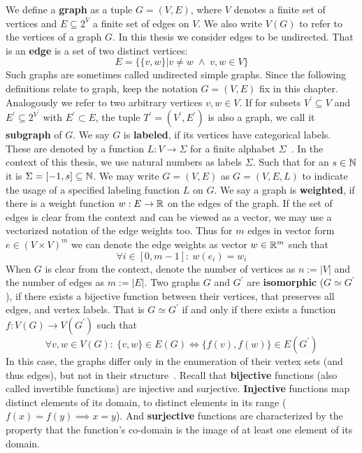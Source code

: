 	We define a \textbf{graph}\label{def:Graph} as a tuple $G=(V, E)$, where $V$ denotes a finite set of vertices and $E\subseteq 2^V$ a finite set of edges on $V$. 
	We also write $V(G)$ to refer to the vertices of a graph $G$.
	In this thesis we consider edges to be undirected. 
	That is an \textbf{edge} is a set of two distinct vertices:
	\[ E=\big\{ \{v,w\}| v\neq w \;\land\; v,w\in V \big\} \]
	Such graphs are sometimes called undirected simple graphs.
	Since the following definitions relate to graph, keep the notation $G=(V,E)$ fix in this chapter.
	Analogously we refer to two arbitrary vertices $v, w\in V$.
	If for subsets $V^\prime \subseteq V$ and $E^\prime \subseteq 2^{V^\prime}$ with $E^\prime\subset E$, the tuple $T^\prime=(V^\prime, E^\prime)$ is also a graph, we call it \textbf{subgraph} of $G$.
	We say $G$ is \textbf{labeled}, if its vertices have categorical labels.
	These are denoted by a function $L:V\to\Sigma$ for a finite alphabet $\Sigma$~\cite{2019_Togninalli_NIPS}.
	In the context of this thesis, we use natural numbers as labels $\Sigma$.
	Such that for an $s\in \mathbb{N}$ it is $\Sigma = [-1, s]\subseteq\mathbb{N}$.
	We may write $G=(V, E)$ as $G=(V, E, L)$ to indicate the usage of a specified labeling function $L$ on $G$.
	We say a graph is \textbf{weighted}, if there is a weight function $w:E\to\mathbb{R}$ on the edges of the graph.
	If the set of edges is clear from the context and can be viewed as a vector, we may use a vectorized notation of the edge weights too.
	Thus for $m$ edges in vector form $e\in (V\times V)^m$ we can denote the edge weights as vector $w\in\mathbb{R}^{m}$ such that
	\[ \forall i \in [0, m-1]: \ w(e_i) = w_i \]	
	When $G$ is clear from the context, denote the number of vertices as $n:=|V|$ and the number of edges as $m:=|E|$.
	Two graphs $G$ and $G^\prime$ are \textbf{isomorphic} ($G\simeq G^\prime$), if there exists a bijective function between their vertices, that preserves all edges, and vertex labels. 
	That is $G\simeq G^\prime$ if and only if there exists a function $f:V(G)\to V(G^\prime)$ such that
	\[ \forall v, w\in V(G): \: \{v, w\}\in E(G) \iff \{f(v), f(w)\}\in E(G^\prime)  \]
	In this case, the graphs differ only in the enumeration of their vertex sets (and thus edges), but not in their structure~\cite{2003_Gaertner_CONF}.
	Recall that \textbf{bijective} functions (also called invertible functions) are injective and surjective.
	\textbf{Injective} functions map distinct elements of its domain, to distinct elements in its range ($f(x)=f(y) \implies x=y$).
	And \textbf{surjective} functions are characterized by the property that the function's co-domain is the image of at least one element of its domain.
	
